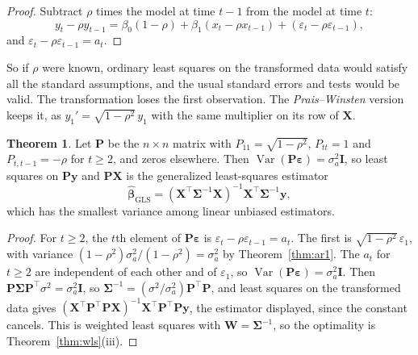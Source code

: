 \documentclass[11pt,a4paper]{article}
\numberwithin{equation}{section}
\theoremstyle{definition}
\newtheorem{thm}{Theorem}[subsection]
\begin{document}
\begin{proof}
Subtract $\rho$ times the model at time $t - 1$ from the model at time $t$:
\[
y_t - \rho y_{t-1} = \beta_0(1 - \rho) + \beta_1(x_t - \rho x_{t-1}) + (\varepsilon_t - \rho\varepsilon_{t-1}) ,
\]
and $\varepsilon_t - \rho\varepsilon_{t-1} = a_t$.
\end{proof}

So if $\rho$ were known, ordinary least squares on the transformed data would satisfy all the standard
assumptions, and the usual standard errors and tests would be valid. The transformation loses the first
observation. The \emph{Prais--Winsten} version keeps it, as $y_1' = \sqrt{1 - \rho^2}\,y_1$ with the same multiplier on its row of $\mathbf{X}$.

\begin{thm}\label{thm:prais-winsten}
Let $\mathbf{P}$ be the $n \times n$ matrix with $P_{11} = \sqrt{1 - \rho^2}$, $P_{tt} = 1$ and $P_{t,t-1} = -\rho$ for $t \ge 2$, and zeros elsewhere. Then
$\operatorname{Var}(\mathbf{P}\boldsymbol\varepsilon) = \sigma_a^2\mathbf{I}$, so least squares on $\mathbf{Py}$ and $\mathbf{PX}$ is the generalized least-squares estimator
\[
\hat{\boldsymbol\beta}_{\mathrm{GLS}} = (\mathbf{X}^\top\boldsymbol\Sigma^{-1}\mathbf{X})^{-1}\mathbf{X}^\top\boldsymbol\Sigma^{-1}\mathbf{y} ,
\]
which has the smallest variance among linear unbiased estimators.
\end{thm}

\begin{proof}
For $t \ge 2$, the $t$th element of $\mathbf{P}\boldsymbol\varepsilon$ is $\varepsilon_t - \rho\varepsilon_{t-1} = a_t$. The first is $\sqrt{1 - \rho^2}\,\varepsilon_1$, with variance
$(1 - \rho^2)\sigma_a^2/(1 - \rho^2) = \sigma_a^2$ by Theorem~\ref{thm:ar1}. The $a_t$ for $t \ge 2$ are independent of each other and of $\varepsilon_1$, so
$\operatorname{Var}(\mathbf{P}\boldsymbol\varepsilon) = \sigma_a^2\mathbf{I}$. Then $\mathbf{P}\boldsymbol\Sigma\mathbf{P}^\top\sigma^2 = \sigma_a^2\mathbf{I}$, so $\boldsymbol\Sigma^{-1} = (\sigma^2/\sigma_a^2)\mathbf{P}^\top\mathbf{P}$, and least squares
on the transformed data gives $(\mathbf{X}^\top\mathbf{P}^\top\mathbf{PX})^{-1}\mathbf{X}^\top\mathbf{P}^\top\mathbf{Py}$, the estimator displayed, since the constant cancels.
This is weighted least squares with $\mathbf{W} = \boldsymbol\Sigma^{-1}$, so the optimality is Theorem~\ref{thm:wls}(iii).
\end{proof}
\end{document}
